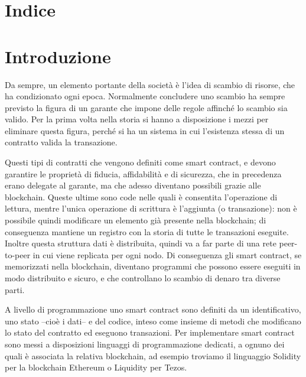 \documentclass[]{article}
\date{}
\begin{document}
\hypertarget{indice}{%
\section{Indice}\label{indice}}

\hypertarget{introduzione}{%
\section{Introduzione}\label{introduzione}}

Da sempre, un elemento portante della società è l'idea di scambio di
risorse, che ha condizionato ogni epoca. Normalmente concludere uno
scambio ha sempre previsto la figura di un garante che impone delle
regole affinché lo scambio sia valido. Per la prima volta nella storia
si hanno a disposizione i mezzi per eliminare questa figura, perché si
ha un sistema in cui l'esistenza stessa di un contratto valida la
transazione.

Questi tipi di contratti che vengono definiti come smart contract, e
devono garantire le proprietà di fiducia, affidabilità e di sicurezza,
che in precedenza erano delegate al garante, ma che adesso diventano
possibili grazie alle blockchain. Queste ultime sono code nelle quali è
consentita l'operazione di lettura, mentre l'unica operazione di
scrittura è l'aggiunta (o transazione): non è possibile quindi
modificare un elemento già presente nella blockchain; di conseguenza
mantiene un registro con la storia di tutte le transazioni eseguite.
Inoltre questa struttura dati è distribuita, quindi va a far parte di
una rete peer-to-peer in cui viene replicata per ogni nodo. Di
conseguenza gli smart contract, se memorizzati nella blockchain,
diventano programmi che possono essere eseguiti in modo distribuito e
sicuro, e che controllano lo scambio di denaro tra diverse parti.

A livello di programmazione uno smart contract sono definiti da un
identificativo, uno stato --cioè i dati-- e del codice, inteso come
insieme di metodi che modificano lo stato del contratto ed eseguono
transazioni. Per implementare smart contract sono messi a disposizioni
linguaggi di programmazione dedicati, a ognuno dei quali è associata la
relativa blockchain, ad esempio troviamo il linguaggio Solidity per la
blockchain Ethereum o Liquidity per Tezos.
\end{document}
